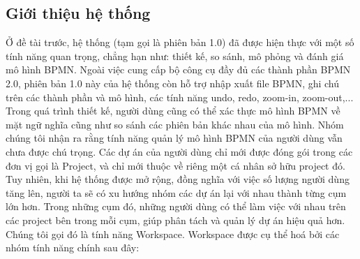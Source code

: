 \subsection{Giới thiệu hệ thống}
Ở đề tài trước, hệ thống (tạm gọi là phiên bản 1.0) đã được hiện thực với một số tính năng quan trọng, chẳng hạn như: thiết kế, so sánh, mô phỏng và đánh giá mô hình BPMN. Ngoài việc cung cấp bộ công cụ đầy đủ các thành phần BPMN 2.0, phiên bản 1.0 này của hệ thống còn hỗ trợ nhập xuất file BPMN, ghi chú trên các thành phần và mô hình, các tính năng undo, redo, zoom-in, zoom-out,... Trong quá trình thiết kế, người dùng cũng có thể xác thực mô hình BPMN về mặt ngữ nghĩa cũng như so sánh các phiên bản khác nhau của mô hình.
\newline
Nhóm chúng tôi nhận ra rằng tính năng quản lý mô hình BPMN của người dùng vẫn chưa được chú trọng. Các dự án của người dùng chỉ mới được đóng gói trong các đơn vị gọi là Project, và chỉ mới thuộc về riêng một cá nhân sở hữu project đó. Tuy nhiên, khi hệ thống được mở rộng, đồng nghĩa với việc số lượng người dùng tăng lên, người ta sẽ có xu hướng nhóm các dự án lại với nhau thành từng cụm lớn hơn. Trong những cụm đó, những người dùng có thể làm việc với nhau trên các project bên trong mỗi cụm, giúp phân tách và quản lý dự án hiệu quả hơn. Chúng tôi gọi đó là tính năng Workspace.
\newline
Workspace được cụ thể hoá bởi các nhóm tính năng chính sau đây:
